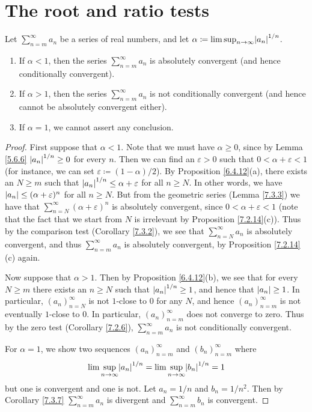 \section{The root and ratio tests}\label{sec 7.5}

\begin{theorem}\label{7.5.1}
Let \(\sum_{n = m}^\infty a_n\) be a series of real numbers, and let \(\alpha \coloneqq \lim\sup_{n \to \infty} \abs*{a_n}^{1 / n}\).
\begin{enumerate}
    \item If \(\alpha < 1\), then the series \(\sum_{n = m}^\infty a_n\) is absolutely convergent
    (and hence conditionally convergent).
    \item If \(\alpha > 1\), then the series \(\sum_{n = m}^\infty a_n\) is not conditionally convergent
    (and hence cannot be absolutely convergent either).
    \item If \(\alpha = 1\), we cannot assert any conclusion.
\end{enumerate}
\end{theorem}

\begin{proof}
First suppose that \(\alpha < 1\).
Note that we must have \(\alpha \geq 0\), since by Lemma \ref{5.6.6} \(\abs*{a_n}^{1 / n} \geq 0\) for every \(n\).
Then we can find an \(\varepsilon > 0\) such that \(0 < \alpha + \varepsilon < 1\) (for instance, we can set \(\varepsilon \coloneqq (1 - \alpha) / 2\)).
By Proposition \ref{6.4.12}(a), there exists an \(N \geq m\) such that \(\abs*{a_n}^{1 / n} \leq \alpha + \varepsilon\) for all \(n \geq N\).
In other words, we have \(\abs*{a_n} \leq (\alpha + \varepsilon)^n\) for all \(n \geq N\).
But from the geometric series (Lemma \ref{7.3.3}) we have that \(\sum_{n = N}^\infty (\alpha + \varepsilon)^n\) is absolutely convergent, since \(0 < \alpha + \varepsilon < 1\)
(note that the fact that we start from \(N\) is irrelevant by Proposition \ref{7.2.14}(c)).
Thus by the comparison test (Corollary \ref{7.3.2}), we see that \(\sum_{n = N}^\infty a_n\) is absolutely convergent, and thus \(\sum_{n = m}^\infty a_n\) is absolutely convergent, by Proposition \ref{7.2.14}(c) again.

Now suppose that \(\alpha > 1\).
Then by Proposition \ref{6.4.12}(b), we see that for every \(N \geq m\) there exists an \(n \geq N\) such that \(\abs*{a_n}^{1 / n} \geq 1\), and hence that \(\abs*{a_n} \geq 1\).
In particular, \((a_n)_{n = N}^\infty\) is not \(1\)-close to \(0\) for any \(N\), and hence \((a_n)_{n = m}^\infty\) is not eventually \(1\)-close to \(0\).
In particular, \((a_n)_{n = m}^\infty\) does not converge to zero.
Thus by the zero test (Corollary \ref{7.2.6}), \(\sum_{n = m}^\infty a_n\) is not conditionally convergent.

For \(\alpha = 1\), we show two sequences \((a_n)_{n = m}^\infty\) and \((b_n)_{n = m}^\infty\) where
\[
    \lim\sup_{n \to \infty} \abs*{a_n}^{1 / n} = \lim\sup_{n \to \infty} \abs*{b_n}^{1 / n} = 1
\]
but one is convergent and one is not.
Let \(a_n = 1 / n\) and \(b_n = 1 / n^2\).
Then by Corollary \ref{7.3.7} \(\sum_{n = m}^\infty a_n\) is divergent and \(\sum_{n = m}^\infty b_n\) is convergent.
\end{proof}

